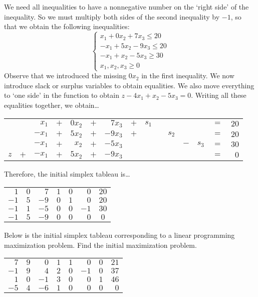 \documentclass[11pt,letterpaper]{article}
\begin{document}
\sol We need all inequalities to have a nonnegative number on the `right side' of the inequality. So we must multiply both sides of the second inequality by $-1$, so that we obtain the following inequalities: 
	\[
	\begin{cases}
	x_1 + 0x_2 + 7x_3 \leq 20 \\
	-x_1 + 5x_2 - 9x_3 \leq 20 \\
	-x_1 + x_2 - 5x_3 \geq 30 \\
	x_1, x_2, x_3 \geq 0	
	\end{cases}
	\]
Observe that we introduced the missing $0x_2$ in the first inequality. We now introduce slack or surplus variables to obtain equalities. We also move everything to `one side' in the function to obtain $z - 4x_1 + x_2 - 5x_3= 0$. Writing all these equalities together, we obtain\dots \par
	\begin{table}[H]
	\centering
	\begin{tabular}{rrrrrrrrrrrrrrr}
	              & & $x_1$ & $+$ & $0x_2$ & $+$ & $7x_3$ & $+$ & $s_1$ & & & & & $=$ & $20$ \\
	              & & $-x_1$ & $+$ & $5x_2$ & $+$ & $-9x_3$ & $+$ & & & $s_2$ & & & $=$ & $20$ \\
	  	      & & $-x_1$ & $+$ & $x_2$ & $+$ & $-5x_3$ & & & & & $-$ &$s_3$ & $=$ & $30$ \\
	 $z$ & $+$ & $-x_1$ & $+$ & $5x_2$ & $+$ & $-9x_3$ & & & & & & & $=$ & $0$ \\
	\end{tabular}
	\end{table} \par
Therefore, the initial simplex tableau is\dots \par
	\begin{table}[H]
	\centering
	\begin{tabular}{rrrrrr|c}
	$1$ & $0$ & $7$ & $1$ & $0$& $0$ & $20$ \\ 
	$-1$ & $5$ & $-9$ & $0$ & $1$ & $0$ & $20$ \\
	$-1$ & $1$ & $-5$ & $0$ & $0$ & $-1$ & $30$ \\ \hline
	$-1$ & $5$ & $-9$ & $0$ & $0$& $0$ & $0$ 
	\end{tabular}
	\end{table}



\newpage



 Below is the initial simplex tableau corresponding to a linear programming maximization problem. Find the initial maximization problem. \par
	\begin{table}[H]
	\centering
	\begin{tabular}{rrrrrrrr}
	$7$ & $9$ & $0$ & $1$ & $1$ & $0$ & $0$ & $21$ \\
	$-1$ & $9$ & $4$ & $2$ & $0$ & $-1$ & $0$ & $37$ \\
	$1$ & $0$ & $-1$ & $3$ & $0$ & $0$ & $1$ & $46$ \\
	$-5$ & $4$ & $-6$ & $1$ & $0$ & $0$ & $0$ & $0$ \\
	\end{tabular}
	\end{table} \pspace
\end{document}
